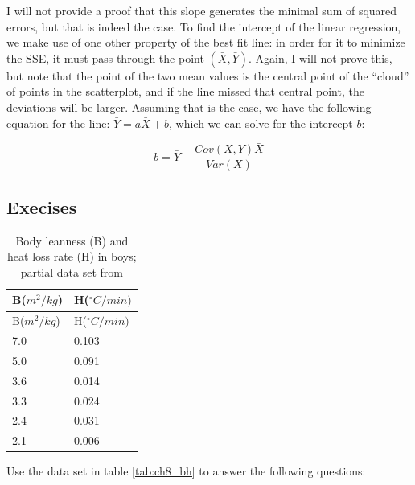 \documentclass[
  letterpaper,
  DIV=11,
  numbers=noendperiod]{scrreprt}
\begin{document}
I will not provide a proof that this slope generates the minimal sum of
squared errors, but that is indeed the case. To find the intercept of
the linear regression, we make use of one other property of the best fit
line: in order for it to minimize the SSE, it must pass through the
point \((\bar X, \bar Y)\). Again, I will not prove this, but note that
the point of the two mean values is the central point of the ``cloud''
of points in the scatterplot, and if the line missed that central point,
the deviations will be larger. Assuming that is the case, we have the
following equation for the line: \(\bar Y = a\bar X + b\), which we can
solve for the 
 intercept \(b\):

\begin{equation}
b = \bar Y - \frac{Cov(X,Y) \bar X}{Var(X)}
\end{equation}

\hypertarget{execises}{%
\subsection{Execises}\label{execises}}

\begin{longtable}[]{@{}ll@{}}
\caption{Body leanness (B) and heat loss rate (H) in boys; partial data
set from \cite{sloan_cooling_1973}}\tabularnewline
\toprule()
B(\(m^2/kg\)) & H(\(^\circ C /min)\) \\
\midrule()
\endfirsthead
\toprule()
B(\(m^2/kg\)) & H(\(^\circ C /min)\) \\
\midrule()
\endhead
7.0 & 0.103 \\
5.0 & 0.091 \\
3.6 & 0.014 \\
3.3 & 0.024 \\
2.4 & 0.031 \\
2.1 & 0.006 \\
\bottomrule()
\end{longtable}

\label{tab:ch8_bh}

Use the data set in table \ref{tab:ch8_bh} to answer the following
questions:
\end{document}
